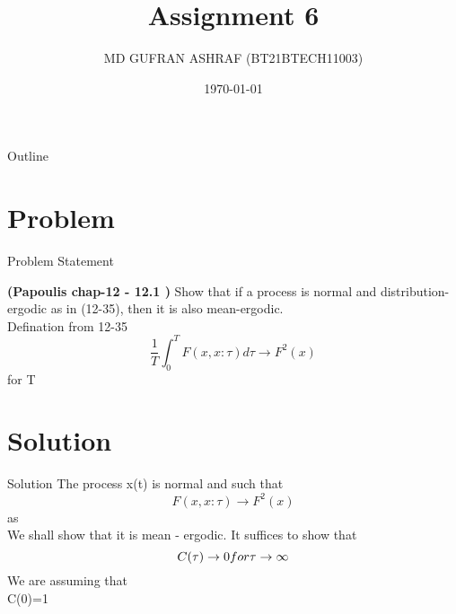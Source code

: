 \documentclass{beamer}
\title{Assignment 6 }
\author{MD GUFRAN ASHRAF (BT21BTECH11003)}
\date{\today}
\begin{document}
\begin{frame}
    \titlepage 
\end{frame}

\begin{frame}{Outline}
    \tableofcontents
\end{frame}


\section{Problem}
\begin{frame}{Problem Statement}

\textbf{(Papoulis chap-12 - 12.1 )}
Show that if a process is normal and distribution-ergodic as in (12-35), then it is also
mean-ergodic.\\
Defination from 12-35
\begin{equation*}
    \frac{1}{T}\int_{0}^{T}F(x,x:\tau)d\tau  \longrightarrow F^2(x)  
\end{equation*}
for T  \rightarrow \infty
\end{frame}


\section{Solution}
\begin{frame}{Solution}
The process x(t) is normal and such that
\begin{equation}
    F(x,x:\tau) \longrightarrow F^2(x) 
\end{equation}
as \tau \rightarrow \infty\\
We shall show that it is mean - ergodic. It suffices to show that
\begin{equation*}
    C(\tau) \rightarrow 0 \\ for \tau \rightarrow \infty
\end{equation*}
We are assuming that  \\  C(0)=1
\end{frame} 
\end{document}
